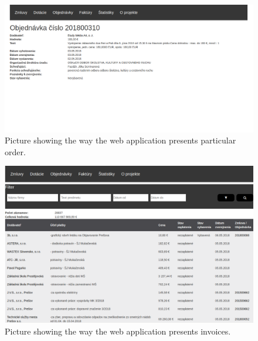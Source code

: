 \documentclass[thesis=B,english]{sprlajur-slovakopendata}[2018/05/12]
\begin{document}
{	\begin{figure}[H]
		\begin{center}
			\includegraphics[scale=0.30]{pictures/orderDetail.png}
			\caption{Picture showing the way the web application presents particular order.}
			\label{fig:webapp-order-detail}
		\end{center}
	\end{figure}
	
	\begin{figure}[H]
		\begin{center}
			\includegraphics[scale=0.30]{pictures/invoices.png}
			\caption{Picture showing the way the web application presents invoices.}
			\label{fig:webapp-invoices}
		\end{center}
	\end{figure}
	
}
\end{document}
